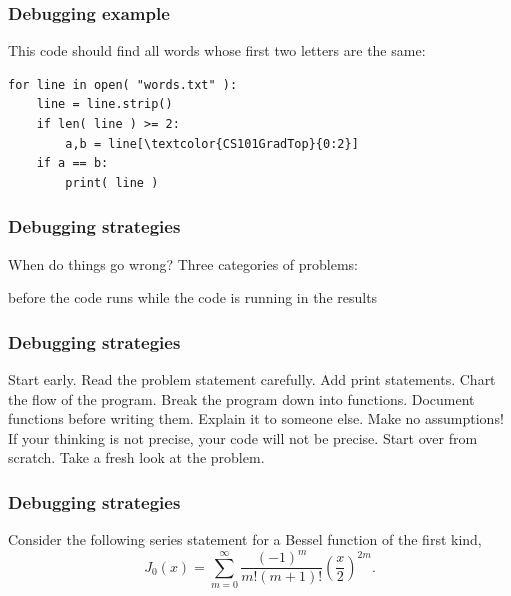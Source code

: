 \documentclass[11pt]{beamer}
\begin{document}
\begin{frame}[fragile]
  \frametitle{Debugging example}

  This code should find all words whose first two letters are the same:
  \begin{Verbatim}[commandchars=\\\{\},commentchar=\%]
for line in open( "words.txt" ):
    line = line.strip()
    if len( line ) >= 2:
        a,b = line[\textcolor{CS101GradTop}{0:2}]
    if a == b:
        print( line )
  \end{Verbatim}
\end{frame}


\begin{frame}[fragile]
  \frametitle{Debugging strategies}
  \Enlarge

  \begin{enumerate}
  \myitem  When do things go wrong? %
  \myitem  Three categories of problems:
    \begin{enumerate}
    \mysubitem  before the code runs
    \mysubitem  while the code is running
    \mysubitem  in the results
    \end{enumerate}
  \end{enumerate}
\end{frame}

\begin{frame}[fragile]
  \frametitle{Debugging strategies}
  \Enlarge

  \begin{enumerate}
  \myitem  Start early. %
  \myitem  Read the problem statement carefully. %
  \myitem  Add print statements. %
  \myitem  Chart the flow of the program. %
  \myitem  Break the program down into functions. %
  \myitem  Document functions before writing them. %
  \myitem  Explain it to someone else. %
  \myitem  Make no assumptions! If your thinking is not precise, your code will not be precise. %
  \myitem  Start over from scratch. Take a fresh look at the problem.
  \end{enumerate}
\end{frame}

\begin{frame}[fragile]
  \frametitle{Debugging strategies}
  \Enlarge

  Consider the following series statement for a Bessel function of the first kind,
  $$J_{0}(x) = \sum_{m=0}^{\infty} \frac{(-1)^{m}}{m! (m+1)!} {\left(\frac{x}{2}\right)}^{2m} \text{.} $$
\end{frame}
\end{document}
